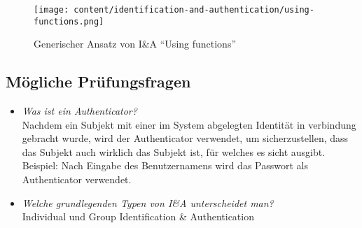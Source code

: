 \begin{figure}[H]
	\centering
	\texttt{[image: content/identification-and-authentication/using-functions.png]}
	\caption{Generischer Ansatz von I\&A ``Using functions'' \cite{SecPatterns06}}
\end{figure}

\subsection*{Mögliche Prüfungsfragen}
\begin{itemize}
	\item \emph{Was ist ein Authenticator?}\\
	Nachdem ein Subjekt mit einer im System abgelegten Identität in verbindung gebracht wurde, wird der Authenticator verwendet, um sicherzustellen, dass das Subjekt auch wirklich das Subjekt ist, für welches es sicht ausgibt.\\
	Beispiel: Nach Eingabe des Benutzernamens wird das Passwort als Authenticator verwendet.

	\item \emph{Welche grundlegenden Typen von I\&A unterscheidet man?}\\
	Individual und Group Identification \& Authentication
\end{itemize}

